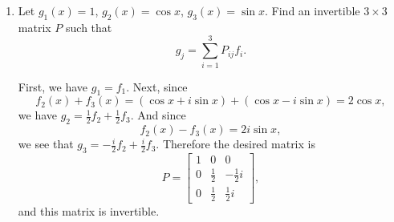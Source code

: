 \begin{enumerate}
\begin{proof}
    Since it is necessary that $c_1 = c_2 = c_3 = 0$, it follows that
    $\{f_1,f_2,f_3\}$ is a linearly independent set.
  \end{proof}
\item Let $g_1(x) = 1$, $g_2(x) = \cos x$, $g_3(x) = \sin x$. Find an
  invertible $3\times3$ matrix $P$ such that
  \begin{equation*}
    g_j = \sum_{i=1}^3 P_{ij}f_i.
  \end{equation*}
  \begin{solution}
    First, we have $g_1 = f_1$. Next, since
    \begin{equation*}
      f_2(x) + f_3(x) = (\cos x + i\sin x) + (\cos x - i\sin x)
      = 2\cos x,
    \end{equation*}
    we have $g_2 = \frac12f_2 + \frac12f_3$. And since
    \begin{equation*}
      f_2(x) - f_3(x) = 2i\sin x,
    \end{equation*}
    we see that $g_3 = -\frac{i}2f_2 + \frac{i}2f_3$. Therefore the
    desired matrix is
    \begin{equation*}
      P =
      \begin{bmatrix}
        1 & 0 & 0 \\[3pt]
        0 & \frac12 & -\frac12i \\[3pt]
        0 & \frac12 & \frac12i
      \end{bmatrix},
    \end{equation*}
    and this matrix is invertible.
  \end{solution}
\end{enumerate}

